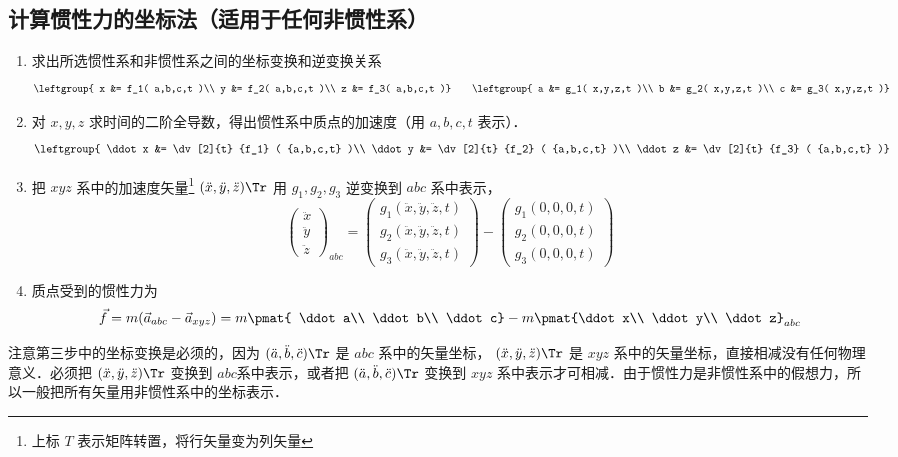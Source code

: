 \subsection{计算惯性力的坐标法（适用于任何非惯性系）}
\begin{enumerate}
\item 求出所选惯性系和非惯性系之间的坐标变换和逆变换关系
\begin{equation}
\leftgroup{
x &= f_1( a,b,c,t )\\
y &= f_2( a,b,c,t )\\
z &= f_3( a,b,c,t )}
\qquad
\leftgroup{
a &= g_1( x,y,z,t )\\
b &= g_2( x,y,z,t )\\
c &= g_3( x,y,z,t )}
\end{equation}
\item 对 $x,y,z$ 求时间的二阶全导数，得出惯性系中质点的加速度（用 $a,b,c,t$ 表示）．
\begin{equation}
\leftgroup{
\ddot x &= \dv[2]{t} {f_1} ( {a,b,c,t} )\\
\ddot y &= \dv[2]{t} {f_2} ( {a,b,c,t} )\\
\ddot z &= \dv[2]{t} {f_3} ( {a,b,c,t} )}
\end{equation}

\item 把 $xyz$ 系中的加速度矢量\footnote{上标 $T$ 表示矩阵转置，将行矢量变为列矢量} $({\ddot x},{\ddot y},{\ddot z})\Tr$ 用 $g_1,g_2,g_3$ 逆变换到 $abc$ 系中表示，
\begin{equation}
\begin{pmatrix} {\ddot x}\\{\ddot y}\\{\ddot z}\end{pmatrix}_{abc} = \begin{pmatrix} g_1(\ddot x,\ddot y,\ddot z, t)\\g_2(\ddot x,\ddot y,\ddot z, t)\\g_3(\ddot x,\ddot y,\ddot z, t)\end{pmatrix} -
\begin{pmatrix} g_1(0,0,0,t)\\g_2(0,0,0,t)\\g_3(0,0,0,t) \end{pmatrix}
\end{equation}

\item 质点受到的惯性力为
\begin{equation}\label{Iner_eq9}
\vec f = m ( \vec a_{abc} - \vec a_{xyz} ) = 
m\pmat{ \ddot a\\ \ddot b\\ \ddot c} - m\pmat{\ddot x\\ \ddot y\\ \ddot z}_{abc}
\end{equation}
\end{enumerate}
注意第三步中的坐标变换是必须的，因为 $({\ddot a},{\ddot b},{\ddot c})\Tr$ 是 $abc$ 系中的矢量坐标， $(\ddot x, \ddot y, \ddot z)\Tr$ 是 $xyz$ 系中的矢量坐标，直接相减没有任何物理意义．必须把 $(\ddot x, \ddot y, \ddot z)\Tr$ 变换到 $abc$系中表示，或者把 $(\ddot a, \ddot b, \ddot c)\Tr$ 变换到 $xyz$ 系中表示才可相减．由于惯性力是非惯性系中的假想力，所以一般把所有矢量用非惯性系中的坐标表示．

